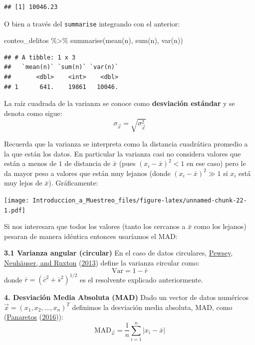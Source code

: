 \documentclass[
]{book}
\newenvironment{Shaded}{\begin{snugshade}}{\end{snugshade}}
\newcommand{\FunctionTok}[1]{\textcolor[rgb]{0.00,0.00,0.00}{#1}}
\newcommand{\NormalTok}[1]{#1}
\newcommand{\SpecialCharTok}[1]{\textcolor[rgb]{0.00,0.00,0.00}{#1}}
\begin{document}
\begin{verbatim}
## [1] 10046.23
\end{verbatim}

O bien a través del \texttt{summarise} integrando con el anterior:

\begin{Shaded}
\begin{Highlighting}[]
\NormalTok{conteo\_delitos }\SpecialCharTok{\%\textgreater{}\%} \FunctionTok{summarise}\NormalTok{(}\FunctionTok{mean}\NormalTok{(n), }\FunctionTok{sum}\NormalTok{(n), }\FunctionTok{var}\NormalTok{(n))}
\end{Highlighting}
\end{Shaded}

\begin{verbatim}
## # A tibble: 1 x 3
##   `mean(n)` `sum(n)` `var(n)`
##       <dbl>    <int>    <dbl>
## 1      641.    19861   10046.
\end{verbatim}

La raíz cuadrada de la varianza se conoce como \textbf{desviación estándar} y se denota como sigue:
\[
\sigma_{\vec{x}} = \sqrt{\sigma^2_{\vec{x}}}
\]

Recuerda que la varianza se interpreta como la distancia cuadrática promedio a la que están los datos. En particular la varianza casi no considera valores que están a menos de \(1\) de distancia de \(\bar{x}\) (pues \((x_i - \bar{x})^2 < 1\) en ese caso) pero le da mayor peso a valores que están muy lejanos (donde \((x_i - \bar{x})^2 \gg 1\) si \(x_i\) está muy lejos de \(\bar{x}\)). Gráficamente:

\texttt{[image: Introduccion\_a\_Muestreo\_files/figure-latex/unnamed-chunk-22-1.pdf]}

Si nos interesara que todos los valores (tanto los cercanos a \(\bar{x}\) como los lejanos) pesaran de manera idéntica entonces usaríamos el MAD:

\textbf{3.1 Varianza angular (circular)} En el caso de datos circulares, \protect\hyperlink{ref-pewsey2013circular}{Pewsey, Neuhäuser, and Ruxton} (\protect\hyperlink{ref-pewsey2013circular}{2013}) define la varianza circular como:
\[
\textrm{Var} = 1 - \bar{r}
\]
donde \(\bar{r} = (\bar{c}^2 + \bar{s}^2)^{1/2}\) es el resolvente explicado anteriormente.

\textbf{4. Desviación Media Absoluta (MAD)} Dado un vector de datos numéricos \(\vec{x} = (x_1, x_2, \dots, x_n)^T\) definimos la desviación media absoluta, MAD, como (\protect\hyperlink{ref-panaretos2016statistics}{Panaretos} (\protect\hyperlink{ref-panaretos2016statistics}{2016})):
\[
\text{MAD}_{\vec{x}} = \frac{1}{n} \sum\limits_{i=1}^{n} | x_i - \bar{x} |
\]
\end{document}
